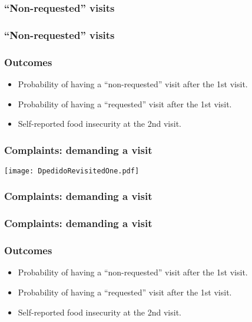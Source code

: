 \documentclass{beamer}
\begin{document}
\begin{frame}
\frametitle{``Non-requested'' visits}
\begin{figure}

\end{figure}
\end{frame}

\begin{frame}
\frametitle{``Non-requested'' visits}
\begin{figure}

\end{figure}
\end{frame}

\begin{frame}
\frametitle{Outcomes}
\begin{itemize}
	\item {\color{gray}Probability of having a ``non-requested'' visit after the 1st visit.}
	\item Probability of having a ``requested'' visit after the 1st visit.
	\item {\color{gray}Self-reported food insecurity at the 2nd visit.}
\end{itemize}
\end{frame}

\begin{frame}
\frametitle{Complaints: demanding a visit}
\begin{center}
	\texttt{[image: DpedidoRevisitedOne.pdf]}
	\label{DpedidoRevisitedOne}
\end{center}
\end{frame}

\begin{frame}
\frametitle{Complaints: demanding a visit}
\begin{figure}
	
\end{figure}
\end{frame}

\begin{frame}
\frametitle{Complaints: demanding a visit}
\begin{figure}
	
\end{figure}
\end{frame}

\begin{frame}
\frametitle{Outcomes}
\begin{itemize}
	\item {\color{gray}Probability of having a ``non-requested'' visit after the 1st visit.}
	\item {\color{gray}Probability of having a ``requested'' visit after the 1st visit.}
	\item Self-reported food insecurity at the 2nd visit.
\end{itemize}
\end{frame}
\end{document}
